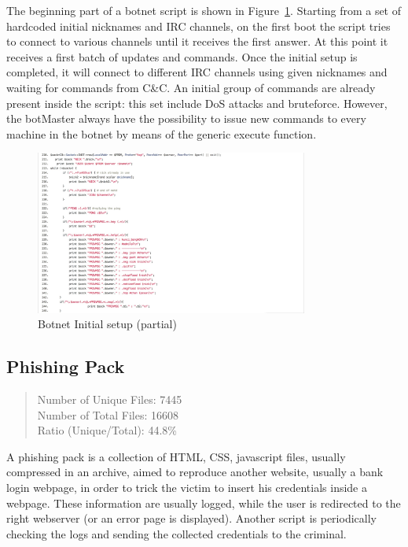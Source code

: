 The beginning part of a botnet script is shown in Figure~\ref{fig:botnet}. Starting from a set of hardcoded initial nicknames and IRC channels, on the first boot the script tries to connect to various channels until it receives the first answer. At this point it receives a first batch of updates and commands. Once the initial setup is completed, it will connect to different IRC channels using given nicknames and waiting for commands from C\&C. An initial group of commands are already present inside the script: this set include DoS attacks and bruteforce. However, the botMaster always have the possibility to issue new commands to every machine in the botnet by means of the generic execute function.

\begin{figure}[H]
\centerline{\includegraphics[width=0.8\textwidth]{Images/botnet.jpg}}
\caption{Botnet Initial setup (partial)\label{fig:botnet}}
\end{figure}

\subsection{Phishing Pack}

\begin{quote}
Number of Unique Files: 7445\\
Number of Total Files: 16608\\
Ratio (Unique/Total): 44.8\%
\end{quote}

A phishing pack is a collection of HTML, CSS, javascript files, usually compressed in an archive, aimed to reproduce another website, usually a bank login webpage, in order to trick the victim to insert his credentials inside a webpage. These information are usually logged, while the user is redirected to the right webserver (or an error page is displayed). Another script is periodically checking the logs and sending the collected credentials to the criminal.

